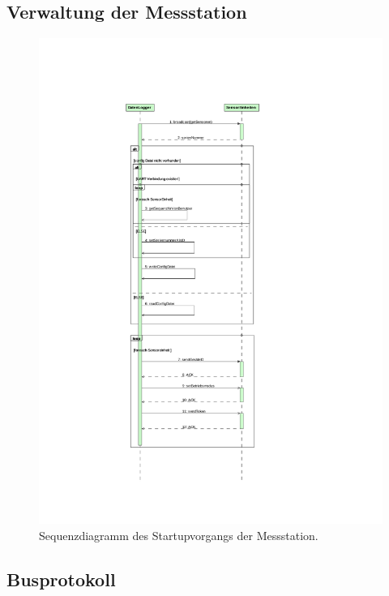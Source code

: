 \subsection{Verwaltung der Messstation}\label{subsec.sw_busverwaltung}

\begin{figure}[H]
	\centering
		\includegraphics[height=0.9\textheight]{images/magicdraw/StartUpSequenz.pdf}
	\caption{Sequenzdiagramm des Startupvorgangs der Messstation.}
	\label{fig.seq_startup}
\end{figure}


\subsection{Busprotokoll}\label{subsec.sw_busprotokoll}

